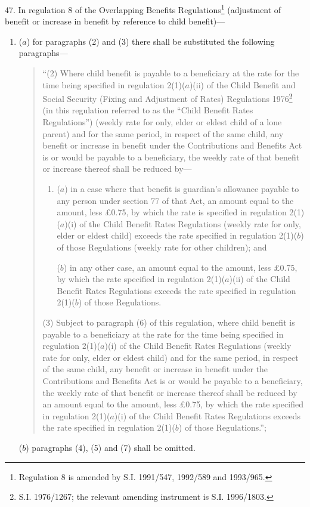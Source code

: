 \documentclass[a4paper]{article}
\begin{document}
47.  In regulation 8 of the Overlapping Benefits Regulations\footnote{\frenchspacing Regulation 8 is amended by S.I. 1991/547, 1992/589 and 1993/965.} (adjustment of benefit or increase in benefit by reference to child benefit)—
\begin{enumerate}\item[]
($a$) for paragraphs (2) and (3) there shall be substituted the following paragraphs—
\begin{quotation}
“(2) Where child benefit is payable to a beneficiary at the rate for the time being specified in regulation 2(1)($a$)(ii) of the Child Benefit and Social Security (Fixing and Adjustment of Rates) Regulations 1976\footnote{\frenchspacing S.I. 1976/1267; the relevant amending instrument is S.I. 1996/1803.} (in this regulation referred to as the “Child Benefit Rates Regulations”) (weekly rate for only, elder or eldest child of a lone parent) and for the same period, in respect of the same child, any benefit or increase in benefit under the Contributions and Benefits Act is or would be payable to a beneficiary, the weekly rate of that benefit or increase thereof shall be reduced by—
\begin{enumerate}\item[]
($a$) in a case where that benefit is guardian’s allowance payable to any person under section 77 of that Act, an amount equal to the amount, less £0.75, by which the rate is specified in regulation 2(1)($a$)(i) of the Child Benefit Rates Regulations (weekly rate for only, elder or eldest child) exceeds the rate specified in regulation 2(1)($b$) of those Regulations (weekly rate for other children); and

($b$) in any other case, an amount equal to the amount, less £0.75, by which the rate specified in regulation 2(1)($a$)(ii) of the Child Benefit Rates Regulations exceeds the rate specified in regulation 2(1)($b$) of those Regulations.
\end{enumerate}

(3) Subject to paragraph (6) of this regulation, where child benefit is payable to a beneficiary at the rate for the time being specified in regulation 2(1)($a$)(i) of the Child Benefit Rates Regulations (weekly rate for only, elder or eldest child) and for the same period, in respect of the same child, any benefit or increase in benefit under the Contributions and Benefits Act is or would be payable to a beneficiary, the weekly rate of that benefit or increase thereof shall be reduced by an amount equal to the amount, less £0.75, by which the rate specified in regulation 2(1)($a$)(i) of the Child Benefit Rates Regulations exceeds the rate specified in regulation 2(1)($b$) of those Regulations.”;
\end{quotation}

($b$) paragraphs (4), (5) and (7) shall be omitted.
\end{enumerate}
\end{document}
